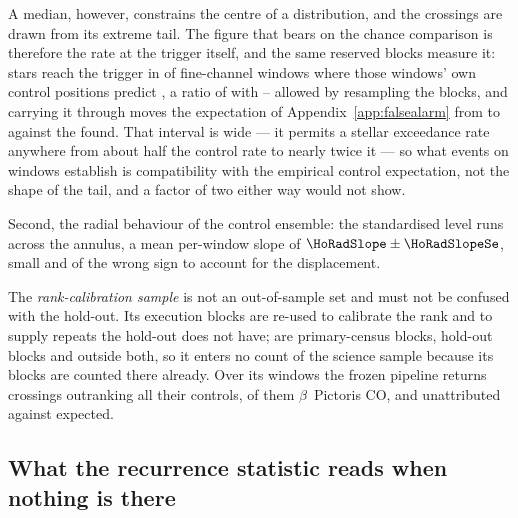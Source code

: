 A median, however, constrains the centre of a distribution, and the
crossings are drawn from its extreme tail. The figure that bears on the
chance comparison is therefore the rate at the trigger itself, and the same
reserved blocks measure it: stars reach the trigger in \StHoObs{} of
\StHoNFine{} fine-channel windows where those windows' own control positions
predict \StHoExpFine, a ratio of \StHoRatio{} with \StHoLo--\StHoHi{}
allowed by resampling the blocks, and carrying it through moves the
expectation of Appendix~\ref{app:falsealarm} from \CeExp{} to \CeExpX{}
against the \CeObs{} found. That interval is wide --- it permits a stellar
exceedance rate anywhere from about half the control rate to nearly twice it
--- so what \StHoObs{} events on \StHoNFine{} windows establish is
compatibility with the empirical control expectation, not the shape of the
tail, and a factor of two either way would not show.

Second, the radial behaviour of the control ensemble: the standardised level
runs \HoRadBins{} across the annulus, a mean per-window slope of
$\HoRadSlope\pm\HoRadSlopeSe$, small and of the wrong sign to account for the
displacement.

The \emph{rank-calibration sample} is not an out-of-sample set and must
not be confused with the hold-out. Its \CampBlocks{} execution blocks are
re-used to calibrate the rank and to supply repeats the hold-out does not
have; \CalNCensus{} are primary-census blocks, \CalNHoldout{} hold-out
blocks and \CalNOutside{} outside both, so it enters no count of the science
sample because its blocks are counted there already. Over its \CampWindows{}
windows the frozen pipeline returns \CampStageOne{} crossings outranking all
their controls, \CampStageOneCO{} of them $\beta$~Pictoris CO, and
\CampUnattrib{} unattributed against \CampExpUn{} expected.

\subsection{What the recurrence statistic reads when nothing is there}

